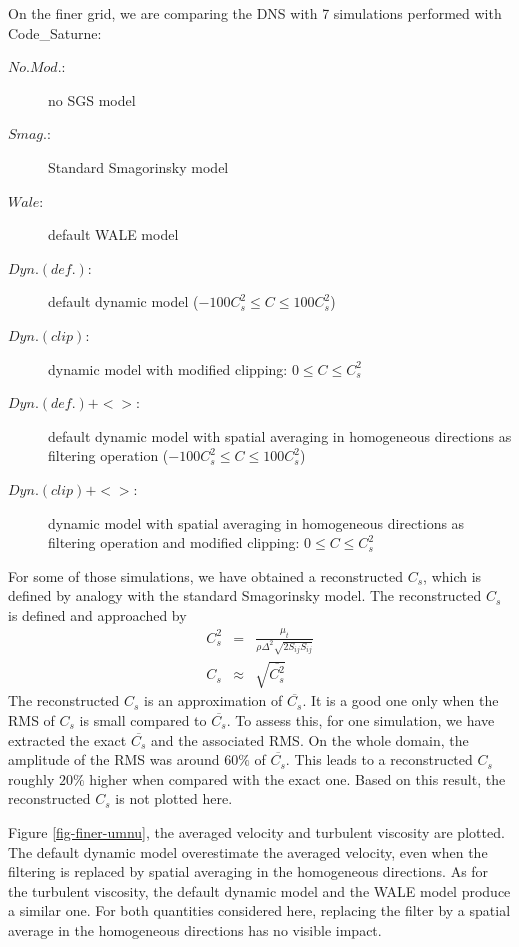 \documentclass[a4paper]{article}
\newcommand{\CS}{%
   {\fontfamily{ppl}\fontshape{it}\selectfont Code\_Saturne}\xspace}
\begin{document}
On the finer grid, we are comparing the DNS with 7 simulations performed with \CS:
\begin{description}
\item[$No.Mod.$:] no SGS model
\item[$Smag.$:] Standard Smagorinsky model
\item[$Wale$:] default WALE model
\item[$Dyn.(def.)$:] default dynamic model ($-100 C_s^2 \leq C \leq 100 C_s^2$)
\item[$Dyn.(clip)$:] dynamic model with modified clipping: $0 \leq C \leq C_s^2$
\item[$Dyn.(def.)+<>$:] default dynamic model with spatial averaging in homogeneous directions as filtering operation ($-100 C_s^2 \leq C \leq 100 C_s^2$)
\item[$Dyn.(clip)+<>$:] dynamic model with spatial averaging in homogeneous directions as filtering operation and modified clipping: $0 \leq C \leq C_s^2$
\end{description}

For some of those simulations, we have obtained a reconstructed $C_s$, which is defined by analogy with the standard Smagorinsky model. The reconstructed $C_s$ is defined and approached by
\begin{eqnarray}
C_s^2 & = & \frac{\mu_t}{\rho \Delta^2 \sqrt{2 S_{ij} S_{ij}}} \nonumber \\
C_s & \approx & \sqrt{ \overline{ C_s^2 }} \nonumber
\end{eqnarray}
The reconstructed $C_s$ is an approximation of $\overline{C_s}$. It is a good one only when the RMS of $C_s$ is small compared to $\overline{C_s}$. To assess this, for one simulation, we have extracted the exact $\overline{C_s}$ and the associated RMS. On the whole domain, the amplitude of the RMS was around $60\%$ of $\overline{C_s}$. This leads to a reconstructed $C_s$ roughly $20\%$ higher when compared with the exact one. Based on this result, the reconstructed $C_s$ is not plotted here.

Figure \ref{fig-finer-umnu}, the averaged velocity and turbulent viscosity are plotted. The default dynamic model overestimate the averaged velocity, even when the filtering is replaced by spatial averaging in the homogeneous directions. As for the turbulent viscosity, the default dynamic model and the WALE model produce a similar one. For both quantities considered here, replacing the filter by a spatial average in the homogeneous directions has no visible impact.
\end{document}
